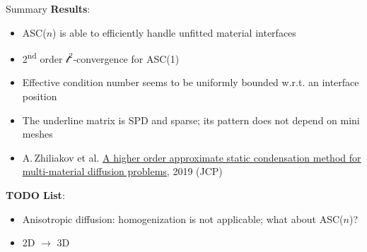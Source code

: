 \documentclass[svgnames]{beamer} %
\newcommand{\lTwo}{{\mathcal l^2}}
\begin{document}
	\begin{frame}{Summary}
		\textbf{Results}:
		\begin{itemize}
			\item ASC($n$) is able to efficiently handle unfitted material interfaces 
			\item 2\textsuperscript{nd} order $\lTwo$-convergence for ASC(1) 
			\item Effective condition number seems to be uniformly bounded w.r.t. an interface position
			\item The underline matrix is SPD and sparse; its pattern does not depend on mini\,meshes
			\item A.\,Zhiliakov et al. \href{https://www.researchgate.net/publication/333900759_A_higher_order_approximate_static_condensation_method_for_multi-material_diffusion_problems}{\ul{A higher order approximate static condensation method for multi-material diffusion problems}}, 2019 (JCP)
		\end{itemize}
		\textbf{TODO List}:
		\begin{itemize}
			\item Anisotropic diffusion: homogenization is not applicable; what about ASC($n$)?
			\item 2D $\rightarrow$ 3D
		\end{itemize}
	\end{frame}
\end{document}
